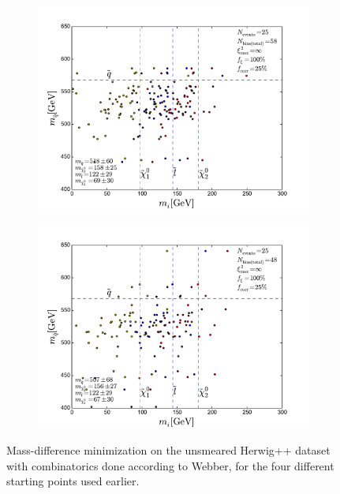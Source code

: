 \documentclass[twoside,english]{uiofysmaster}
\begin{document}
\begin{figure}[hbt]
	\begin{subfigure}[b]{0.45\textwidth}
		\includegraphics[width=\textwidth]{figures/improving_combinatorics/herwigpp-MD-dileptonedge-fit-comb-nosmear-nocut_800-500-300-50.pdf} 
		\caption{ }
	\end{subfigure}
	\begin{subfigure}[b]{0.45\textwidth}
		\includegraphics[width=\textwidth]{figures/improving_combinatorics/herwigpp-MD-dileptonedge-fit-comb-nosmear-nocut_1000-100-80-30.pdf}
		\caption{ } 
	\end{subfigure}
	\caption{Mass-difference minimization on the unsmeared Herwig++ dataset with combinatorics done according to Webber, for the four different starting points used earlier.}
	\label{fig:MD_starting_point_sensitivity_combinatorics}
\end{figure}
\end{document}
